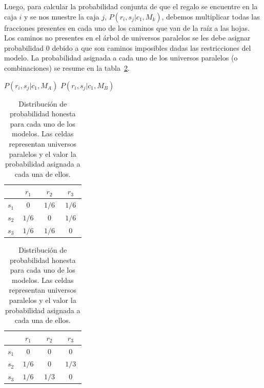 \documentclass[a4paper,11pt]{book}
\theoremstyle{definition}
\begin{document}
Luego, para calcular la probabilidad conjunta de que el regalo se encuentre en la caja $i$ y se nos muestre la caja $j$, $P(r_i, s_j|c_1,M_k)$, debemos multiplicar todas las fracciones presentes en cada uno de los caminos que van de la ra\'iz a las hojas.
%
Los caminos no presentes en el árbol de universos paralelos se les debe asignar probabilidad 0 debido a que son caminos imposibles dadas las restricciones del modelo.
%
La probabilidad asignada a cada uno de los universos paralelos (o combinaciones) se resume en la tabla~\ref{tab:creencia_conjunta}.
%
\begin{table}[ht!]
\centering
$P(r_i, s_j |c_1, M_A)$ \hspace{3cm} $P(r_i, s_j | c_1, M_B)$ \\[0.1cm]
 \begin{tabular}{|c|c|c|c|} \hline \setlength\tabcolsep{0.4cm}
       & \, $r_1$ \, &  \, $r_2$ \, & \, $r_3$ \, \\ \hline
  $s_1$ & $0$ & $1/6$ & $1/6$  \\ \hline
  $s_2$ & $1/6$ & $0$ & $1/6$  \\ \hline
  $s_3$ & $1/6$ & $1/6$ & $0$ \\ \hline
  \end{tabular}
  \hspace{1.5cm}
  \begin{tabular}{|c|c|c|c|} \hline  \setlength\tabcolsep{0.4cm}
 & \, $r_1$ \, &  \, $r_2$ \, & \, $r_3$ \,  \\ \hline
  $s_1$ & $0$ & $0$ & $0$ \\ \hline
  $s_2$ & $1/6$ & $0$ & $1/3$ \\ \hline
  $s_3$ & $1/6$ & $1/3$ & $0$  \\ \hline
  \end{tabular}
  \caption{Distribución de probabilidad honesta para cada uno de los modelos. Las celdas representan universos paralelos y el valor la probabilidad asignada a cada una de ellos.}
  \label{tab:creencia_conjunta}
\end{table}

\end{document}
